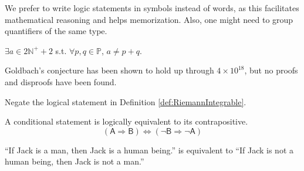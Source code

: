 \begin{rem}
  We prefer to write logic statements in symbols
  instead of words, 
  as this facilitates mathematical reasoning
  and helps memorization.
  Also, one might need to group quantifiers of the same type.
\end{rem}

\begin{exm}
  $\exists a\in 2\mathbb{N}^++2$ s.t. $\forall p,q \in \mathbb{P}$, 
   $a\ne p+q$.
\end{exm}

\begin{rem}
 Goldbach's conjecture has been shown to hold up through $4\times10^{18}$,
   but no proofs and disproofs have been found.
\end{rem}

\begin{exc}
 Negate the logical statement in Definition \ref{def:RiemannIntegrable}.
\end{exc}


\begin{axm}[Contraposition]
  \label{axm:contrapositive}
  A conditional statement is logically equivalent to its
  contrapositive.
  \begin{equation}
    \label{eq:contraposition}
    (\mathsf{A}\Rightarrow \mathsf{B}) \Leftrightarrow
    (\neg \mathsf{B}\Rightarrow \neg \mathsf{A})
  \end{equation}
\end{axm}

\begin{exm}
  \label{exm:contrapositive}
  ``If Jack is a man, then Jack is a human being.''
  is equivalent to ``If Jack is not a human being,
  then Jack is not a man.''
\end{exm}

